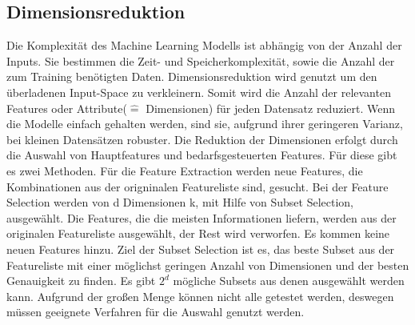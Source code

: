 	 
	 
	 \subsection{Dimensionsreduktion}
	 Die Komplexität des Machine Learning Modells ist abhängig von der Anzahl der Inputs. Sie bestimmen die Zeit- und Speicherkomplexität, sowie die Anzahl der zum Training benötigten Daten. \cite{Alpaydin2004} Dimensionsreduktion wird genutzt um den überladenen Input-Space zu verkleinern. Somit wird die Anzahl der relevanten Features oder Attribute($\widehat{=}$ Dimensionen) für jeden Datensatz reduziert. \cite{Sarkar2018} Wenn die Modelle einfach gehalten werden, sind sie, aufgrund ihrer geringeren Varianz, bei kleinen Datensätzen robuster. \cite{Alpaydin2004} Die Reduktion der Dimensionen erfolgt durch die Auswahl von Hauptfeatures und bedarfsgesteuerten Features. Für diese gibt es zwei Methoden. \cite{Sarkar2018}
	 \newline
	 Für die Feature Extraction werden neue Features, die Kombinationen aus der origninalen Featureliste sind, gesucht. \cite{Alpaydin2004}
	 \newline
	 Bei der Feature Selection werden von d Dimensionen k, mit Hilfe von Subset Selection, ausgewählt. \cite{Alpaydin2004} Die Features, die die meisten Informationen liefern, werden aus der originalen Featureliste ausgewählt, der Rest wird verworfen. Es kommen keine neuen Features hinzu. \cite{Sarkar2018}\newline
	 Ziel der Subset Selection ist es, das beste Subset aus der Featureliste mit einer möglichst geringen Anzahl von Dimensionen und der besten Genauigkeit zu finden. Es gibt $2^{d}$ mögliche Subsets aus denen ausgewählt werden kann. Aufgrund der großen Menge können nicht alle getestet werden, deswegen müssen geeignete Verfahren für die Auswahl genutzt werden. \cite{Alpaydin2004}
	 
